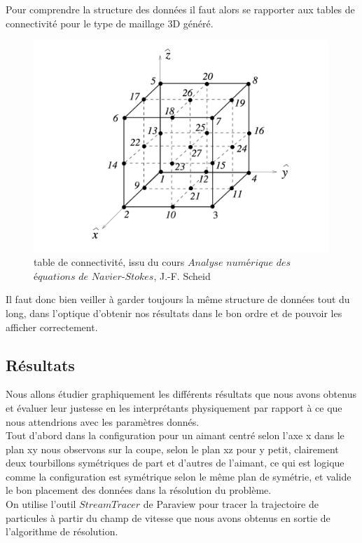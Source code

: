 \documentclass[a4paper,12pt,titlepage]{report}
\begin{document}
\begin{onehalfspace}
\newpage
Pour comprendre la structure des données il faut alors se rapporter  aux tables de connectivité pour le type de maillage 3D généré.
\begin{figure}[h]
\center
\includegraphics[height = 8cm, keepaspectratio]{graphes/table_de_connectivite.png} 
\caption{\label{figure 38 } table de connectivité, issu du cours $Analyse$ $numérique$ $des$ $équations$ $de$ $Navier$-$Stokes$, J.-F. Scheid}
\end{figure}
Il faut donc bien veiller à garder toujours la même structure de données tout du long, dans l'optique d'obtenir nos résultats dans le bon ordre et de pouvoir les afficher correctement.
 
\newpage
\subsection{Résultats}
Nous allons étudier graphiquement les différents résultats que nous avons obtenus et évaluer leur justesse en les interprétants physiquement par rapport à ce que nous attendrions avec les paramètres donnés.
\newline
\\
Tout d'abord dans la configuration pour un aimant centré selon l'axe x dans le plan xy nous observons sur la coupe, selon le plan xz pour y petit, clairement deux tourbillons symétriques de part et d'autres de l'aimant, ce qui est logique comme la configuration est symétrique selon le même plan de symétrie, et valide le bon placement des données dans la résolution du problème.
\\
On utilise l'outil $StreamTracer$ de Paraview pour tracer la trajectoire de particules à partir du champ de vitesse que nous avons obtenus en sortie de l'algorithme de résolution.


\end{onehalfspace}
\end{document}
